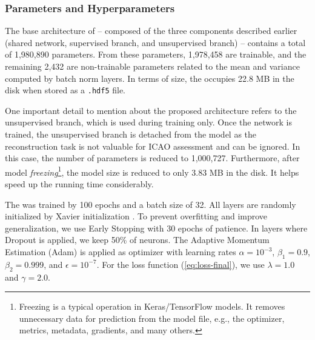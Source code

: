 \subsubsection{Parameters and Hyperparameters} 

The base architecture of \methodname -- composed of the three components described earlier (shared network, supervised branch, and unsupervised branch) -- contains a total of 1,980,890 parameters. From these parameters, 1,978,458 are trainable, and the remaining 2,432 are non-trainable parameters related to the mean and variance computed by batch norm layers. In terms of size, the \methodname occupies 22.8 MB in the disk when stored as a \texttt{.hdf5} file.

One important detail to mention about the proposed architecture refers to the unsupervised branch, which is used during training only. Once the network is trained, the unsupervised branch is detached from the model as the reconstruction task is not valuable for ICAO assessment and can be ignored. In this case, the number of parameters is reduced to 1,000,727. Furthermore, after model \textit{freezing}\footnote{Freezing is a typical operation in Keras/TensorFlow models. It removes unnecessary data for prediction from the model file, e.g., the optimizer, metrics, metadata, gradients, and many others.}, the model size is reduced to only 3.83 MB in the disk. It helps speed up the running time considerably.

The \methodname was trained by 100 epochs and a batch size of 32. All layers are randomly initialized by Xavier initialization \citep{glorot2010understanding}. To prevent overfitting and improve generalization, we use Early Stopping with 30 epochs of patience. In layers where Dropout is applied, we keep 50\% of neurons. The Adaptive Momentum Estimation (Adam) is applied as optimizer with learning rates $\alpha=10^{-3}$, $\beta_1=0.9$, $\beta_2=0.999$, and $\epsilon=10^{-7}$. For the loss function (\autoref{eq:loss-final}), we use $\lambda=1.0$ and $\gamma=2.0$.

